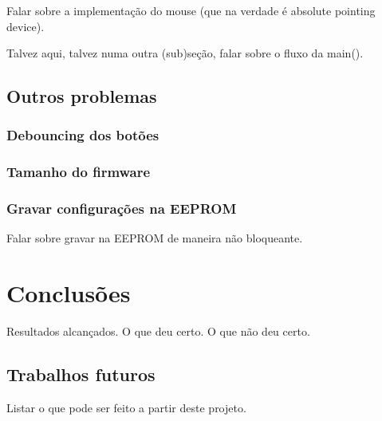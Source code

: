 \documentclass[brazil,pagestart=firstchapter]{abnt}
\begin{document}
Falar sobre a implementação do mouse (que na verdade é absolute pointing
device).

Talvez aqui, talvez numa outra (sub)seção, falar sobre o fluxo da main().

\section{Outros problemas\label{sec:outros_problemas}}

\subsection{Debouncing dos botões\label{sec:debouncing}}

\subsection{Tamanho do firmware\label{sec:firmware_size}}

\subsection{Gravar configurações na EEPROM\label{sec:eeprom}}

Falar sobre gravar na EEPROM de maneira não bloqueante.

\chapter{Conclusões\label{cap:conclusoes}}

Resultados alcançados. O que deu certo. O que não deu certo.

\section{Trabalhos futuros\label{sec:trabalhos_futuros}}

Listar o que pode ser feito a partir deste projeto.







\anexo
\end{document}
